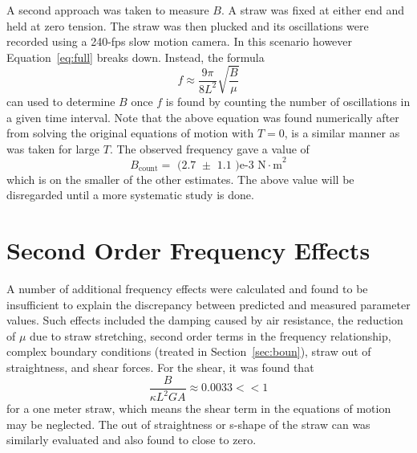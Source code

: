 \documentclass[twoside]{article}
\begin{document}
\begin{multicols}{2}
A second approach was taken to measure $B$.  A straw was fixed at either end and held at zero tension. The straw was then plucked and its oscillations were recorded using a 240-fps slow motion camera.   In this scenario however Equation~\ref{eq:full} breaks down. Instead, the formula
\begin{equation}
	f \approx \frac{9 \pi}{8 L^2}\sqrt{\frac{B}{\mu}}
\end{equation}
can used to determine $B$ once $f$ is found by counting the number of oscillations in a given time interval.
 Note that the above equation was found numerically after from solving the original equations of motion with $T=0$, is a similar manner as was taken for large $T$.  The observed frequency gave a value of 
 \begin{equation}
 B_\text{count} = \text{  (2.7 $\pm$ 1.1 )e-3  N$\cdot$m}^2
 \end{equation}
which is on the smaller of the other estimates. The above value will be disregarded until a more systematic study is done.







\section{Second Order Frequency Effects}
A number of additional frequency effects were calculated and found to be insufficient to explain the discrepancy between predicted and measured parameter values. Such effects included the damping caused by air resistance, the reduction of $\mu$ due to straw stretching, second order terms in the frequency relationship, complex boundary conditions (treated in Section~\ref{sec:boun}), straw out of straightness, and shear forces. For the shear, it was found that
\begin{equation}
	\frac{B}{\kappa L^2 G A}\approx 0.0033 << 1
\end{equation}
for a one meter straw, which means the shear term in the equations of motion may be neglected. The out of straightness or s-shape of the straw can was similarly evaluated and also found to close to zero. 



\end{multicols}
\end{document}
